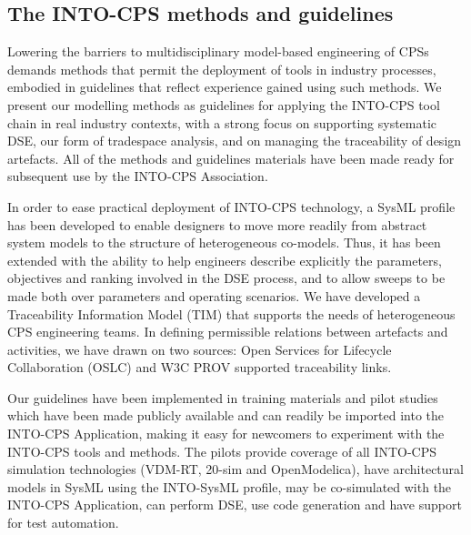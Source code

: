 \subsection{The INTO-CPS methods and guidelines}

Lowering the barriers to multidisciplinary model-based engineering of CPSs demands methods that permit the deployment of tools in industry processes, embodied in guidelines that reflect experience gained using such methods. We present our modelling methods as guidelines for applying the INTO-CPS tool chain in real industry contexts, with a strong focus on supporting systematic DSE, our form of tradespace analysis, and on managing the traceability of design artefacts. All of the methods and guidelines materials have been made ready for subsequent use by the INTO-CPS Association.  

In order to ease practical deployment of INTO-CPS technology, a SysML profile has been developed to enable designers to move more readily from abstract system models to the structure of heterogeneous co-models. Thus, it has been extended with the ability to help engineers describe explicitly the parameters, objectives and ranking involved in the DSE process, and to allow sweeps to be made both over parameters and operating scenarios. We have developed a Traceability Information Model (TIM) that supports the needs of heterogeneous CPS engineering teams. In defining permissible relations between artefacts and activities, we have drawn on two sources: Open Services for Lifecycle Collaboration (OSLC)  and W3C PROV supported traceability links.

Our guidelines have been implemented in training materials and pilot studies which have been made publicly available and can readily be imported into the INTO-CPS Application, making it easy for newcomers to experiment with the INTO-CPS tools and methods. The pilots provide coverage of all INTO-CPS simulation technologies (VDM-RT, 20-sim and OpenModelica), have architectural models in SysML using the INTO-SysML profile, may be co-simulated with the INTO-CPS Application, can perform DSE, use code generation and have support for test automation. 
